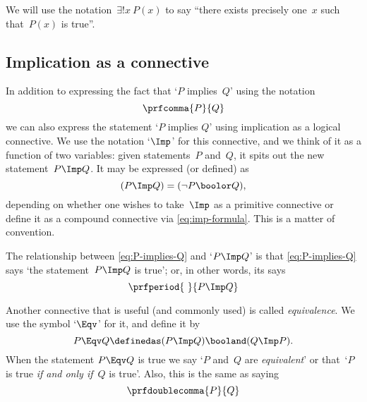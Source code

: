 We will use the notation~$\exists!
    x \ P(x)$ to say ``there exists precisely one~$x$ such that~$P(x)$ is true''.

\subsection{Implication as a connective}

In addition to expressing the fact that `$P$ implies~$Q$' using the notation
\begin{equation}
    \label{eq:P-implies-Q}
    \prfcomma
    {P}{Q}
\end{equation}
we can also express the statement `$P$ implies $Q$' using implication as a logical connective.
We use the notation `$\Imp$' for this connective, and we think of it as a function of two variables:
given statements~$P$ and~$Q$, it spits out the new statement~$P \Imp Q$.
It may be expressed (or defined) as
\begin{equation}
    \label{eq:imp-formula}
    (P \Imp Q) = (\lnot P \boolor Q),
\end{equation}
depending on whether one wishes to take~$\Imp$ as a primitive connective or define it as a compound connective via \cref{eq:imp-formula}.
This is a matter of convention.

The relationship between \cref{eq:P-implies-Q} and `$P \Imp Q$' is that  \cref{eq:P-implies-Q} says `the statement~$P \Imp Q$ is true'; or, in other words, its says
\begin{equation}
    \prfperiod
    {\ }{P \Imp Q}
\end{equation}

Another connective that is useful (and commonly used) is called \emph{equivalence}.
We use the symbol `$\Eqv$' for it, and define it by
\begin{equation}
    P \Eqv Q \definedas (P \Imp Q) \booland (Q \Imp P).
\end{equation}
When the statement $P \Eqv Q$ is true we say `$P$ and~$Q$ are \emph{equivalent}' or that~`$P$ is true \emph{if and only if}~$Q$ is true'.
Also, this is the same as saying
\begin{equation}
    \prfdoublecomma{
        P
    }{
        Q
    }
\end{equation}

